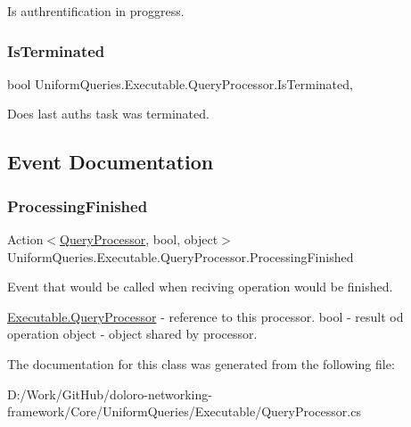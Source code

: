 Is authrentification in proggress. 

\mbox{\label{class_uniform_queries_1_1_executable_1_1_query_processor_a6782b3a610851ec2eabb04b43172b7e0}} 
\subsubsection{\texorpdfstring{Is\+Terminated}{IsTerminated}}
{\footnotesize\ttfamily bool Uniform\+Queries.\+Executable.\+Query\+Processor.\+Is\+Terminated\hspace{0.3cm}{\ttfamily [get]}, {}}



Does last auth\textquotesingle{}s task was terminated. 



\subsection{Event Documentation}
\mbox{\label{class_uniform_queries_1_1_executable_1_1_query_processor_a87f6d66a2f0bdd9ff0c0a3e66e716efe}} 
\subsubsection{\texorpdfstring{Processing\+Finished}{ProcessingFinished}}
{\footnotesize\ttfamily Action$<$\mbox{\hyperlink{class_uniform_queries_1_1_executable_1_1_query_processor}{Query\+Processor}}, bool, object$>$ Uniform\+Queries.\+Executable.\+Query\+Processor.\+Processing\+Finished}



Event that would be called when reciving operation would be finished. 

\mbox{\hyperlink{class_uniform_queries_1_1_executable_1_1_query_processor}{Executable.\+Query\+Processor}} -\/ reference to this processor. bool -\/ result od operation object -\/ object shared by processor. 

The documentation for this class was generated from the following file\+:\begin{DoxyCompactItemize}
\item 
D\+:/\+Work/\+Git\+Hub/doloro-\/networking-\/framework/\+Core/\+Uniform\+Queries/\+Executable/Query\+Processor.\+cs\end{DoxyCompactItemize}
